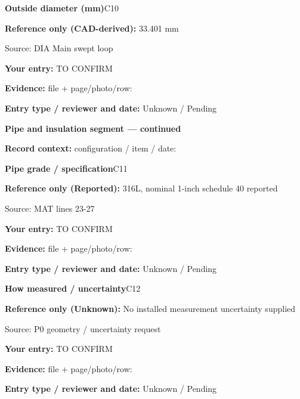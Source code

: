 \documentclass[11pt]{article}
\begin{document}
\begin{minipage}{\textwidth}\small
{\color{navy}\bfseries Outside diameter (mm)}\hfill C10\par
\colorbox{pale}{\parbox{\dimexpr\linewidth-2\fboxsep\relax}{
\textbf{Reference only (CAD-derived):} 33.401 mm\par
{\footnotesize Source: DIA Main swept loop}}}\par
\textbf{Your entry:} {\color{muted}TO CONFIRM}\enspace\hrulefill\par
{\footnotesize\textbf{Evidence:} file + page/photo/row: \hrulefill\par
\textbf{Entry type / reviewer and date:} Unknown / Pending\par
}\end{minipage}\par\vspace{5pt}
\clearpage
{\large\bfseries Pipe and insulation segment --- continued}\par
\textbf{Record context:} configuration / item / date: \hrulefill\par
\begin{minipage}{\textwidth}\small
{\color{navy}\bfseries Pipe grade / specification}\hfill C11\par
\colorbox{pale}{\parbox{\dimexpr\linewidth-2\fboxsep\relax}{
\textbf{Reference only (Reported):} 316L, nominal 1-inch schedule 40 reported\par
{\footnotesize Source: MAT lines 23-27}}}\par
\textbf{Your entry:} {\color{muted}TO CONFIRM}\enspace\hrulefill\par
{\footnotesize\textbf{Evidence:} file + page/photo/row: \hrulefill\par
\textbf{Entry type / reviewer and date:} Unknown / Pending\par
}\end{minipage}\par\vspace{5pt}
\begin{minipage}{\textwidth}\small
{\color{navy}\bfseries How measured / uncertainty}\hfill C12\par
\colorbox{pale}{\parbox{\dimexpr\linewidth-2\fboxsep\relax}{
\textbf{Reference only (Unknown):} No installed measurement uncertainty supplied\par
{\footnotesize Source: P0 geometry / uncertainty request}}}\par
\textbf{Your entry:} {\color{muted}TO CONFIRM}\enspace\hrulefill\par
{\footnotesize\textbf{Evidence:} file + page/photo/row: \hrulefill\par
\textbf{Entry type / reviewer and date:} Unknown / Pending\par
}\end{minipage}\par\vspace{5pt}
\end{document}
